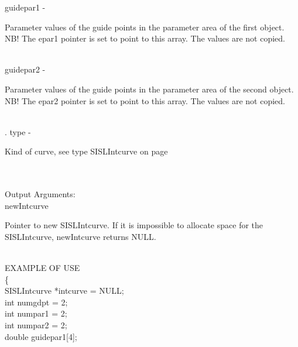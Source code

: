         \>\>    {\fov guidepar1}\> - \> \begin{minipg2}
                                Parameter values of the guide points in the parameter
                                area of the first object.
                                NB! The epar1 pointer is set to point to this
                                array. The values are not copied.
                                \end{minipg2}\\[0.3ex]
        \>\>    {\fov guidepar2}\> - \> \begin{minipg2}
                                Parameter values of the guide points in the parameter
                                area of the second object.
                                NB! The epar2 pointer is set to point to this
                                array. The values are not copied.
                                \end{minipg2}\\[0.3ex].
        \>\>    {\fov type} \> - \> \begin{minipg2}
                                Kind of curve, see type SISLIntcurve on
                                page \pageref{SISLIntcurve}
                                \end{minipg2}\\
\\
        \>Output Arguments:\\
        \>\>    {\fov newIntcurve} \> \> \begin{minipg2}
                                 Pointer to new SISLIntcurve. If it is impossible
                                 to allocate space for the SISLIntcurve, newIntcurve
                                 returns NULL.
                                \end{minipg2}\\
\newpagetabs
EXAMPLE OF USE\\
                \>      \{ \\
                \>\>    SISLIntcurve    \>      *{\fov intcurve = NULL};\\
                \>\>    int    \>       {\fov numgdpt} = 2;\\
                \>\>    int    \>       {\fov numpar1} = 2;\\
                \>\>    int    \>       {\fov numpar2} = 2;\\
                \>\>    double \>       {\fov guidepar1}[4];\\
